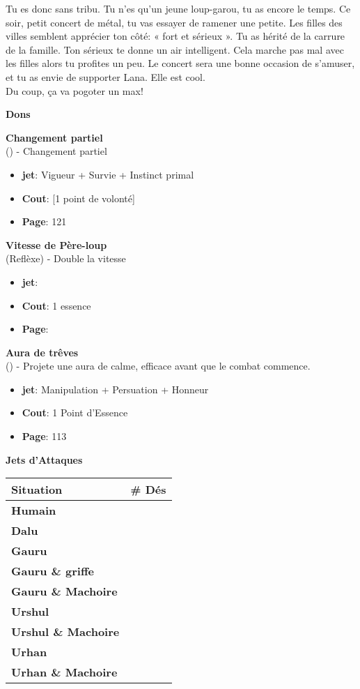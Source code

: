 \documentclass[oneside,12pt]{book}
\newcommand\don[6]{
\textbf{#1} \\
(#6) - #2
\begin{itemize}
\item{ \textbf{jet}: #3}
\item{ \textbf{Cout}: #4}
\item{ \textbf{Page}: #5}
\end{itemize}
\vspace{0.5cm}
}
\newcounter{Somme}
\newcommand\attackRoll[1]{
\setcounter{Somme}{#1}
\textbf{Jets d'Attaques} \\
\begin{tabularx}{7cm}{|X|c|}
\hline
\textbf{Situation} & \textbf{\# Dés} \\
\hline
\textbf{Humain} & \theSomme \\
\hline
\addtocounter{Somme}{1}
\textbf{Dalu} & \theSomme \\
\hline
\addtocounter{Somme}{2}
\textbf{Gauru}& \theSomme \\
\hline
\addtocounter{Somme}{1}
\textbf{Gauru \& griffe}& \theSomme \\
\hline
\addtocounter{Somme}{1}
\textbf{Gauru \& Machoire}& \theSomme \\
\hline
\setcounter{Somme}{#1}
\addtocounter{Somme}{2}
\textbf{Urshul}& \theSomme \\
\hline
\addtocounter{Somme}{2}
\textbf{Urshul \& Machoire}& \theSomme \\
\hline
\setcounter{Somme}{#1}
\textbf{Urhan}& \theSomme \\
\hline
\addtocounter{Somme}{2}
\textbf{Urhan \& Machoire}& \theSomme \\
\hline
\end{tabularx}

}
\begin{document}
\begin{flushleft}
\begin{description}
{Tu es donc sans tribu. Tu n'es qu'un jeune loup-garou, tu as encore le temps. Ce soir, petit concert de métal, tu vas essayer de ramener une petite. Les filles des villes semblent apprécier 
ton côté: « fort et sérieux ». Tu as hérité de la carrure de la famille. Ton sérieux te donne un air intelligent. Cela marche pas mal avec les filles alors tu profites un peu.
Le concert sera une bonne occasion de s'amuser, et tu as envie de supporter Lana. Elle est cool.\\
Du coup, ça va pogoter un max!
}
\end{description}
\clearpage
\textbf{\large Dons} 
\vspace{0.5cm}

\don{Changement partiel}{Changement partiel}{Vigueur + Survie + Instinct primal}{[1 point de volonté]}{121}{}
\don{Vitesse de Père-loup}{Double la vitesse}{}{1 essence}{}{Reflèxe}
\don{Aura de trêves}{Projete une aura de calme, efficace avant que le combat commence.}{Manipulation + Persuation + Honneur}{1 Point d'Essence}{113}{}


\attackRoll{3}

\clearpage



\end{flushleft}
\end{document}
